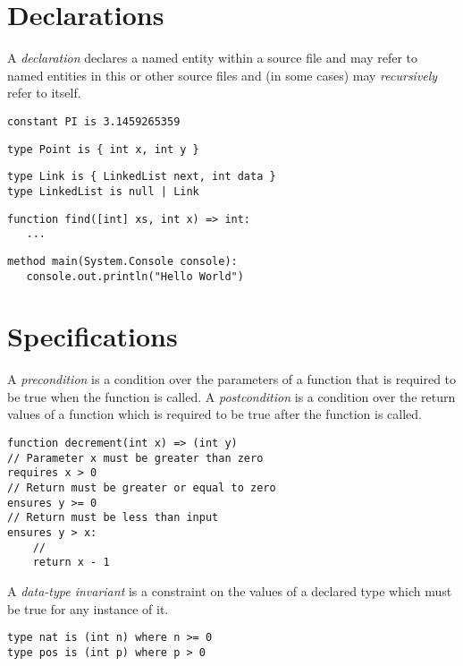 \documentclass[a4paper,10pt,twcolumn]{article}
\begin{document}
\section*{Declarations}
A {\em declaration} declares a named entity within a source file and may refer to named entities in this or other source files and (in some cases) may {\em recursively} refer to itself.

\begin{lstlisting}
constant PI is 3.1459265359
\end{lstlisting}

\begin{lstlisting}
type Point is { int x, int y }
\end{lstlisting}

\begin{lstlisting}
type Link is { LinkedList next, int data }
type LinkedList is null | Link
\end{lstlisting}

\begin{lstlisting}
function find([int] xs, int x) => int:
   ...
\end{lstlisting}

\begin{lstlisting}
method main(System.Console console):
   console.out.println("Hello World")
\end{lstlisting}

\section*{Specifications}

A {\em precondition} is a condition over the parameters of a function
that is required to be true when the function is called.  A {\em
  postcondition} is a condition over the return values of a function
which is required to be true after the function is called.

\begin{lstlisting}
function decrement(int x) => (int y) 
// Parameter x must be greater than zero
requires x > 0
// Return must be greater or equal to zero
ensures y >= 0
// Return must be less than input
ensures y > x:
    //
    return x - 1
\end{lstlisting}

A {\em data-type invariant} is a constraint on the values of a
declared type which must be true for any instance of it.

\begin{lstlisting}
type nat is (int n) where n >= 0
type pos is (int p) where p > 0
\end{lstlisting}
\end{document}
